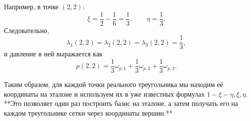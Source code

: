 \documentclass[a4paper,14pt]{extarticle}
\begin{document}
	Например, в точке \((2,2)\):
	\[
	\xi=\frac12-\frac16=\frac13,\qquad
	\eta=\frac13.
	\]
	Следовательно,
	\[
	\lambda_1(2,2)=\lambda_2(2,2)=\lambda_3(2,2)=\frac13,
	\]
	и давление в ней выражается как
	\[
	p(2,2)=\frac13\omega_{p,1}
	+\frac13\omega_{p,2}
	+\frac13\omega_{p,3}.
	\]
	
	Таким образом, для каждой точки реального треугольника мы находим её координаты на эталоне и используем их в уже известных формулах \(1-\xi-\eta,\xi,\eta\). **Это позволяет один раз построить базис на эталоне, а затем получать его на каждом треугольнике сетки через координаты вершин.**
	
\end{document}
